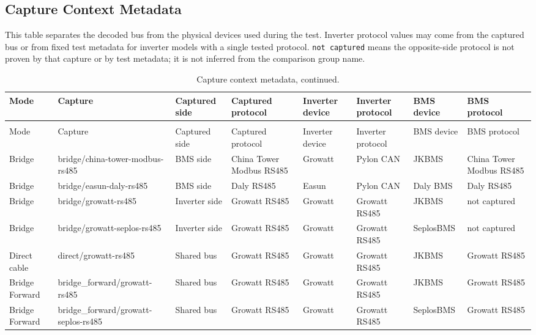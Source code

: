 \documentclass[11pt,a4paper]{article}
\begin{document}
\begin{landscape}
\section*{Capture Context Metadata}

\small
This table separates the decoded bus from the physical devices used during the
test. Inverter protocol values may come from the captured bus or from fixed
test metadata for inverter models with a single tested protocol. \texttt{not
captured} means the opposite-side protocol is not proven by that capture or by
test metadata; it is not inferred from the comparison group name.

\begingroup
\scriptsize
\setlength{\tabcolsep}{3pt}
\setlength{\LTpre}{0.45em}
\setlength{\LTpost}{0.65em}
\begin{longtable}{@{}L{1.6cm}L{3.6cm}L{2.2cm}L{3.0cm}L{2.0cm}L{2.8cm}L{2.0cm}L{3.0cm}@{}}
\caption{Capture context metadata.}\\
\toprule
Mode & Capture & Captured side & Captured protocol & Inverter device & Inverter protocol & BMS device & BMS protocol \\
\midrule
\endfirsthead
\caption[]{Capture context metadata, continued.}\\
\toprule
Mode & Capture & Captured side & Captured protocol & Inverter device & Inverter protocol & BMS device & BMS protocol \\
\midrule
\endhead
Bridge & bridge/china-tower-modbus-rs485 & BMS side & China Tower Modbus RS485 & Growatt & Pylon CAN & JKBMS & China Tower Modbus RS485 \\
Bridge & bridge/easun-daly-rs485 & BMS side & Daly RS485 & Easun & Pylon CAN & Daly BMS & Daly RS485 \\
Bridge & bridge/growatt-rs485 & Inverter side & Growatt RS485 & Growatt & Growatt RS485 & JKBMS & not captured \\
Bridge & bridge/growatt-seplos-rs485 & Inverter side & Growatt RS485 & Growatt & Growatt RS485 & SeplosBMS & not captured \\
Direct cable & direct/growatt-rs485 & Shared bus & Growatt RS485 & Growatt & Growatt RS485 & JKBMS & Growatt RS485 \\
Bridge Forward & bridge\_forward/growatt-rs485 & Shared bus & Growatt RS485 & Growatt & Growatt RS485 & JKBMS & Growatt RS485 \\
Bridge Forward & bridge\_forward/growatt-seplos-rs485 & Shared bus & Growatt RS485 & Growatt & Growatt RS485 & SeplosBMS & Growatt RS485 \\

\end{longtable}
\end{landscape}
\end{document}
